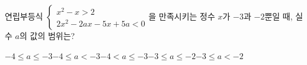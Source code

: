 연립부등식 $\begin{cases} x^2-x>2 \\ 2x^2-2ax-5x+5a<0 \end{cases}$을 만족시키는 정수 $x$가 $-3$과 $-2$뿐일 때, 실수 $a$의 값의 범위는?
\begin{choices32}{$-4\le a\le -3$}{$-4\le a<-3$}{$-4<a\le -3$}{$-3\le a\le -2$}{$-3\le a<-2$}\end{choices32}
